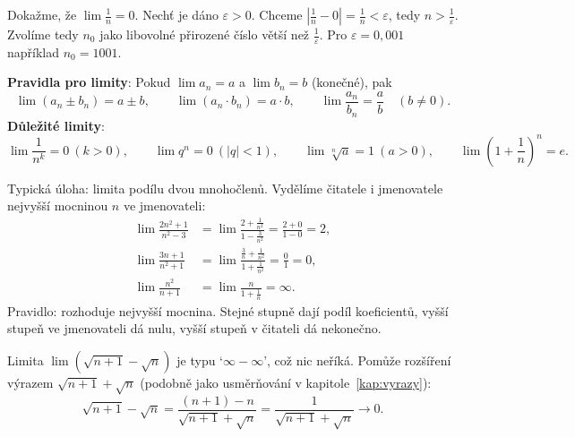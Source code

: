 \begin{example}
  Dokažme, že $\lim\frac{1}{n} = 0$. Nechť je dáno $\varepsilon > 0$. Chceme $\left|\frac{1}{n} - 0\right| = \frac{1}{n} < \varepsilon$, tedy $n > \frac{1}{\varepsilon}$. Zvolíme tedy $n_0$ jako libovolné přirozené číslo větší než $\frac{1}{\varepsilon}$. Pro $\varepsilon = 0{,}001$ například $n_0 = 1001$.
\end{example}

\begin{definitionbox}
  \textbf{Pravidla pro limity}: Pokud $\lim a_n = a$ a $\lim b_n = b$ (konečné), pak
  \begin{equation*}
    \lim(a_n\pm b_n) = a\pm b,\qquad\lim(a_n\cdot b_n) = a\cdot b,\qquad\lim\frac{a_n}{b_n} = \frac{a}{b}\quad(b\neq 0).
  \end{equation*}
  \textbf{Důležité limity}:
  \begin{equation*}
    \lim\frac{1}{n^k} = 0\ (k > 0),\qquad\lim q^n = 0\ (|q| < 1),\qquad\lim\sqrt[n]{a} = 1\ (a > 0),\qquad\lim{\left(1 + \frac{1}{n}\right)}^n = e.
  \end{equation*}
\end{definitionbox}

\begin{example}
  Typická úloha: limita podílu dvou mnohočlenů. Vydělíme čitatele i jmenovatele nejvyšší mocninou $n$ ve jmenovateli:
  \begin{align*}
    \lim\frac{2n^2 + 1}{n^2 - 3} &= \lim\frac{2 + \frac{1}{n^2}}{1 - \frac{3}{n^2}} = \frac{2 + 0}{1 - 0} = 2,\\
    \lim\frac{3n + 1}{n^2 + 1} &= \lim\frac{\frac{3}{n} + \frac{1}{n^2}}{1 + \frac{1}{n^2}} = \frac{0}{1} = 0,\\
    \lim\frac{n^2}{n + 1} &= \lim\frac{n}{1 + \frac{1}{n}} = \infty.
  \end{align*}
  Pravidlo: rozhoduje nejvyšší mocnina. Stejné stupně dají podíl koeficientů, vyšší stupeň ve jmenovateli dá nulu, vyšší stupeň v čitateli dá nekonečno.
\end{example}

\begin{example}
  Limita $\lim\left(\sqrt{n + 1} - \sqrt{n}\right)$ je typu `$\infty - \infty$', což nic neříká. Pomůže rozšíření výrazem $\sqrt{n + 1} + \sqrt{n}$ (podobně jako usměrňování v kapitole~\ref{kap:vyrazy}):
  \begin{equation*}
    \sqrt{n + 1} - \sqrt{n} = \frac{(n + 1) - n}{\sqrt{n + 1} + \sqrt{n}} = \frac{1}{\sqrt{n + 1} + \sqrt{n}}\to 0.
  \end{equation*}
\end{example}


